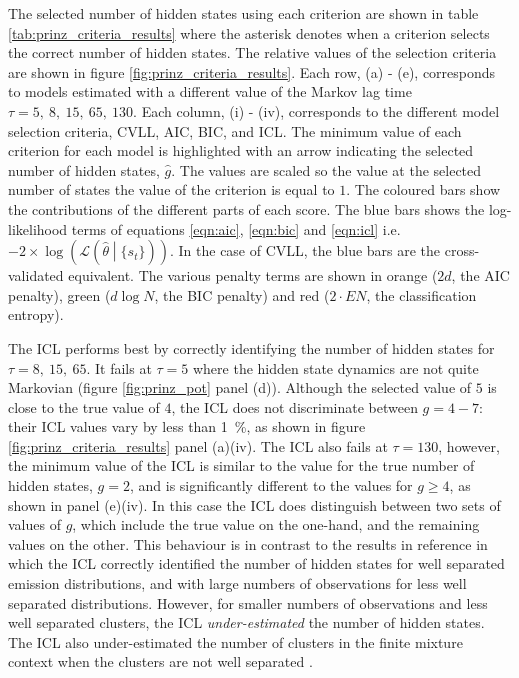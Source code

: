 The selected number of hidden states using each criterion are shown in table \ref{tab:prinz_criteria_results} where the asterisk denotes when a criterion selects the correct number of hidden states. The relative values of the selection criteria are shown in figure \ref{fig:prinz_criteria_results}. Each row, (a) - (e), corresponds to models estimated with a  different value of the Markov lag time $\tau=5,\ 8,\ 15,\ 65,\ 130$. Each column, (i) - (iv), corresponds to the different model selection criteria, CVLL, AIC, BIC, and ICL. The minimum value of each criterion for each model is highlighted with an arrow indicating the selected number of hidden states, $\hat{g}$. The values are scaled so the value at the selected number of states the value of the criterion is equal to $1$.  The coloured bars show the contributions of the different parts of each score. The blue bars shows the log-likelihood terms of equations \ref{eqn:aic}, \ref{eqn:bic} and \ref{eqn:icl} i.e.  $-2\times \log{\left(\mathcal{L}\left(\hat{\theta}\middle |\{s_t\}\right)\right)}$. In the case of CVLL, the blue bars are the  cross-validated equivalent. The various penalty terms are shown in orange ($2d$, the AIC penalty), green ($d\log{N}$, the BIC penalty) and red ($2\cdot EN$, the classification entropy). 

The ICL performs best by correctly identifying the number of hidden states for $\tau=8,\ 15,\ 65$. It fails at $\tau=5$ where the hidden state dynamics are not quite Markovian (figure \ref{fig:prinz_pot} panel (d)). Although the selected value of $5$ is close to the true value of $4$, the ICL does not discriminate between $g=4 - 7$: their ICL values vary by less than \SI{1}{\percent}, as shown in figure \ref{fig:prinz_criteria_results} panel (a)(iv). The ICL also fails at $\tau=130$, however, the minimum value of the ICL is similar to the value for the true number of hidden states, $g = 2$, and is significantly different to the values for $g \ge 4$,  as shown in panel (e)(iv). In this case the ICL does distinguish between two sets of values of $g$, which include the true value on the one-hand, and the remaining values on the other. This behaviour is in contrast to the results in reference \cite{celeuxSelectingHiddenMarkov2008} in which the ICL correctly identified the number of hidden states for well separated emission distributions, and with large numbers of observations for less well separated distributions. However, for smaller numbers of observations and less well separated clusters, the ICL \emph{under-estimated} the number of hidden states. The ICL also under-estimated the number of clusters in the finite mixture context when the clusters are not well separated \cite{biernackiAssessingMixtureModel2000a}. 

